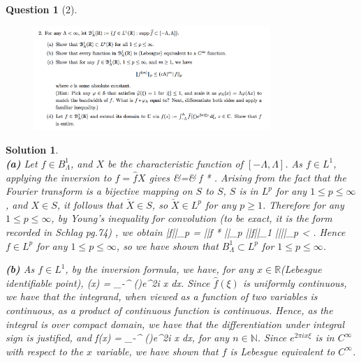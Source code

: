 \documentclass{article} %
\def\eQb#1\eQe{\begin{eqnarray*}#1\end{eqnarray*}}
\theoremstyle{quest}
\newtheorem*{question}{Question}
\newtheorem*{solution}{Solution}
\begin{document}
\begin{question}[2]
\hfill
\begin{figure}[h!]
  \centering
    \includegraphics[width=0.8\textwidth]{HA-5-2.png}
\end{figure}
\end{question}
\begin{solution} \hfill \\
\textbf{(a)}
Let $f \in B^{1}_{\Lambda}$, and
$X$ be the characteristic function of $[-\Lambda, \Lambda]$. As $f \in L^{1}$, applying 
the inversion to $\hat{f} = \hat{f}X$ gives
\eQb
f &=& f * . 
\eQe
Arising from the fact that the Fourier transform is a bijective mapping on $S$ to $S$,
$S$ is in $L^p$ for any $1 \leq p \leq \infty$, and $X \in S$, 
it follows that $\check{X} \in S$, so $\check{X} \in L^p$ for any $p \geq 1$.
Therefore for any $1 \leq p \leq \infty$, by Young's inequality for convolution (to be exact, it
is the form recorded in Schlag pg.74) , we obtain
\eQb
||f||_{p} = ||f * ||_{p} \leq ||f||_{1} ||||_{p} < \infty.
\eQe
Hence $f \in L^p$ for any $1 \leq p \leq \infty$, so we have shown that $B^1_{\Lambda} \subset 
L^p$ for $1 \leq p \leq \infty$.

\bigskip

\textbf{(b)} 
As $f \in L^1$, by the inversion formula, we have, for any $x \in \mathbb{R}$(Lebesgue identifiable point),
\eQb
f(x) = \int_{-\Lambda}^{\Lambda} (\xi)e^{2\pi i x \xi } dx.
\eQe
Since $\hat{f}(\xi)$ is uniformly continuous, we have that the integrand, when viewed as a function of 
two variables is continuous, as a product of continuous function is continuous. Hence, as the
integral is over compact domain, we have
that the differentiation under integral sign is justified, and
\eQb
\dfrac{d^n}{dx} f(x) = \int_{-\Lambda}^{\Lambda}  (\xi)e^{2\pi i x \xi } dx,
\eQe
for any $n \in \mathbb{N}$. Since $e^{2\pi i x \xi}$ is in $C^{\infty}$ with respect to the $x$ 
variable, we have shown that $f$ is Lebesgue equivalent to $C^{\infty}$.


\end{solution}
\end{document}
